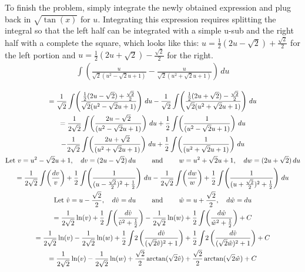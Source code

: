 \documentclass{article}
\theoremstyle{definition}
\begin{document}
To finish the problem, simply integrate the newly obtained expression and plug back in 
$\sqrt{\tan(x)}$ for $u$. Integrating this expression requires splitting the integral
so that the left half can be integrated with a simple u-sub and the right half with a 
complete the square, which looks like this: $u = \frac{1}{2}(2u-\sqrt{2})+\frac{\sqrt{2}}{2}$
for the left portion and $u = \frac{1}{2}(2u+\sqrt{2})-\frac{\sqrt{2}}{2}$ for the right.
\begin{equation*}
\begin{gathered}
    \int\! \left(\frac{u}{\sqrt{2}(u^2-\sqrt{2}u+1)} - \frac{u}{\sqrt{2}(u^2+\sqrt{2}u+1)}\right)\,du\\
\end{gathered}
\end{equation*}
\begin{equation*}
\begin{gathered}
    =\frac{1}{\sqrt{2}}\int\! \left(\frac{\frac{1}{2}(2u-\sqrt{2})+\frac{\sqrt{2}}{2}}{\sqrt{2}(u^2-\sqrt{2}u+1)}\right)\,du - %
    \frac{1}{\sqrt{2}}\int\! \left(\frac{\frac{1}{2}(2u+\sqrt{2})-\frac{\sqrt{2}}{2}}{\sqrt{2}(u^2+\sqrt{2}u+1)}\right)\,du\\
    =\frac{1}{2\sqrt{2}}\int\! \left(\frac{2u-\sqrt{2}}{(u^2-\sqrt{2}u+1)}\right)\,du + %
    \frac{1}{2}\int\! \left(\frac{1}{(u^2-\sqrt{2}u+1)}\right)\,du  \\
    -\frac{1}{2\sqrt{2}}\int\! \left(\frac{2u+\sqrt{2}}{(u^2+\sqrt{2}u+1)}\right)\,du + %
    \frac{1}{2}\int\! \left(\frac{1}{(u^2+\sqrt{2}u+1)}\right)\,du\\
    \textrm{Let $v=u^2-\sqrt{2}u+1,\quad dv = (2u-\sqrt{2}) \,du$ \qquad and \qquad $w=u^2+\sqrt{2}u+1, %
    \quad dw=(2u+\sqrt{2}) \,du$}\\
    =\frac{1}{2\sqrt{2}}\int\! \left(\frac{dv}{v}\right) + %
    \frac{1}{2}\int\! \left(\frac{1}{(u-\frac{\sqrt{2}}{2})^2+\frac{1}{2}}\right)\,du
    -\frac{1}{2\sqrt{2}}\int\! \left(\frac{dw}{w}\right) + %
    \frac{1}{2}\int\! \left(\frac{1}{(u+\frac{\sqrt{2}}{2})^2+\frac{1}{2}}\right)\,du\\
    \textrm{Let $\hat{v}=u-\frac{\sqrt{2}}{2},\quad d\hat{v} = du$ \qquad and \qquad %
    $\hat{w}=u+\frac{\sqrt{2}}{2},\quad d\hat{w} = du$}\\
    =\frac{1}{2\sqrt{2}}\ln(v) + \frac{1}{2}\int\! \left(\frac{d\hat{v}}{\hat{v}^2+\frac{1}{2}}\right)
    -\frac{1}{2\sqrt{2}}\ln(w) + \frac{1}{2}\int\! \left(\frac{d\hat{w}}{\hat{w}^2+\frac{1}{2}}\right) + C\\
    =\frac{1}{2\sqrt{2}}\ln(v) - \frac{1}{2\sqrt{2}}\ln(w) + %
    \frac{1}{2}\int\! 2\left(\frac{d\hat{v}}{(\sqrt{2}\hat{v})^2+1}\right) +
    \frac{1}{2}\int\! 2\left(\frac{d\hat{v}}{(\sqrt{2}\hat{w})^2+1}\right) + C\\
    =\frac{1}{2\sqrt{2}}\ln(v) - \frac{1}{2\sqrt{2}}\ln(w) + 
    \frac{\sqrt{2}}{2}\arctan(\sqrt{2}\hat{v}) + \frac{\sqrt{2}}{2}\arctan(\sqrt{2}\hat{w}) + C
\end{gathered}
\end{equation*}
\end{document}
